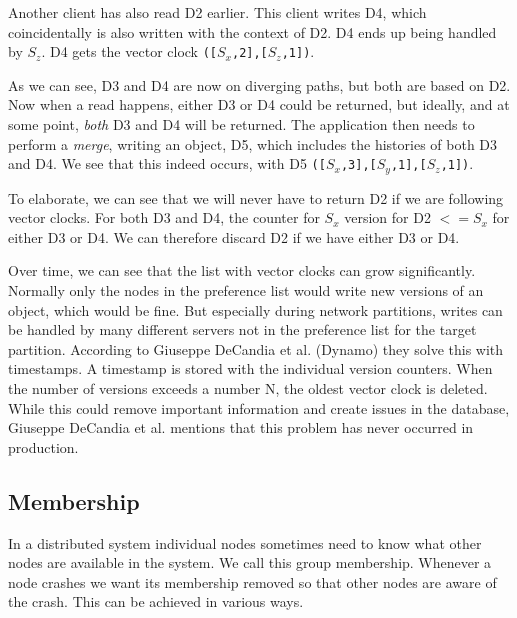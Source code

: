 Another client has also read D2 earlier. This client writes D4, which coincidentally is also written with the context of D2. D4 ends up being handled by $S_z$. D4 gets the vector clock \texttt{([$S_x$,2],[$S_z$,1])}.

As we can see, D3 and D4 are now on diverging paths, but both are based on D2.
Now when a read happens, either D3 or D4 could be returned, but ideally, and at some point, \emph{both} D3 and D4 will be returned.
The application then needs to perform a \emph{merge}, writing an object, D5, which includes the histories of both D3 and D4.
We see that this indeed occurs, with D5 \texttt{([$S_x$,3],[$S_y$,1],[$S_z$,1])}.

To elaborate, we can see that we will never have to return D2 if we are following vector clocks.
For both D3 and D4, the counter for $S_x$ version for D2 $<= S_x$ for either D3 or D4. We can therefore discard D2 if we have either D3 or D4.

Over time, we can see that the list with vector clocks can grow significantly. Normally only the nodes in the preference list would write new versions of an object, which would be fine. But especially during network partitions, writes can be handled by many different servers not in the preference list for the target partition.
According to Giuseppe DeCandia et al. (Dynamo)\cite{dynamo} they solve this with timestamps. A timestamp is stored with the individual version counters. 
When the number of versions exceeds a number N, the oldest vector clock is deleted.
While this could remove important information and create issues in the database, Giuseppe DeCandia et al.\cite{dynamo} mentions that this problem has never occurred in production.

\subsection{Membership}
In a distributed system individual nodes sometimes need to know what other nodes are available in the system. We call this group membership. Whenever a node crashes we want its membership removed so that other nodes are aware of the crash. This can be achieved in various ways. 

